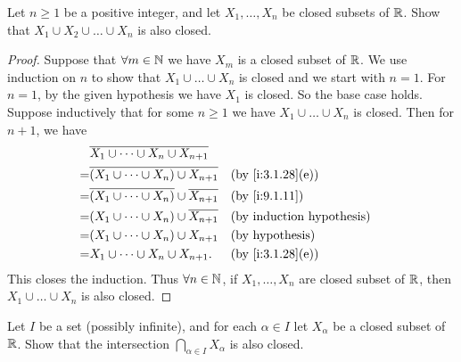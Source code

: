 \begin{ex}\label{i:ex:9.1.7}
  Let \(n \geq 1\) be a positive integer, and let \(X_1, \dots, X_n\) be closed subsets of \(\mathbb{R}\).
  Show that \(X_1 \cup X_2 \cup \dots \cup X_n\) is also closed.
\end{ex}

\begin{proof}
  Suppose that \(\forall m \in \mathbb{N}\) we have \(X_m\) is a closed subset of \(\mathbb{R}\).
  We use induction on \(n\) to show that \(X_1 \cup \dots \cup X_n\) is closed and we start with \(n = 1\).
  For \(n = 1\), by the given hypothesis we have \(X_1\) is closed.
  So the base case holds.
  Suppose inductively that for some \(n \geq 1\) we have \(X_1 \cup \dots \cup X_n\) is closed.
  Then for \(n + 1\), we have
  \begin{align*}
      & \overline{X_1 \cup \dots \cup X_n \cup X_{n + 1}}                                          \\
    = & \overline{(X_1 \cup \dots \cup X_n) \cup X_{n + 1}}            &  & \by{i:3.1.28}[e]       \\
    = & \overline{(X_1 \cup \dots \cup X_n)} \cup \overline{X_{n + 1}} &  & \by{i:9.1.11}          \\
    = & (X_1 \cup \dots \cup X_n) \cup \overline{X_{n + 1}}            &  & \byIH                  \\
    = & (X_1 \cup \dots \cup X_n) \cup X_{n + 1}                       &  & \text{(by hypothesis)} \\
    = & X_1 \cup \dots \cup X_n \cup X_{n + 1}.                        &  & \by{i:3.1.28}[e]
  \end{align*}
  This closes the induction.
  Thus \(\forall n \in \mathbb{N}\), if \(X_1, \dots, X_n\) are closed subset of \(\mathbb{R}\), then \(X_1 \cup \dots \cup X_n\) is also closed.
\end{proof}

\begin{ex}\label{i:ex:9.1.8}
  Let \(I\) be a set (possibly infinite), and for each \(\alpha \in I\) let \(X_{\alpha}\) be a closed subset of \(\mathbb{R}\).
  Show that the intersection \(\bigcap_{\alpha \in I} X_{\alpha}\) is also closed.
\end{ex}


